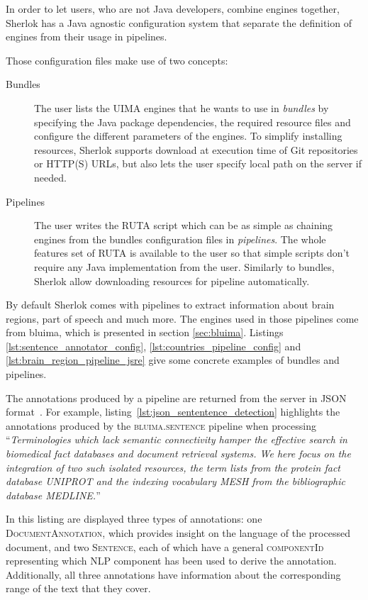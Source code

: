 \documentclass{article}
\newcommand{\ID}[1]{{\textsc{#1}}}
\begin{document}
In order to let users, who are not Java developers, combine engines together, Sherlok has a Java
agnostic configuration system that separate the definition of engines from their usage in pipelines.

Those configuration files make use of two concepts:

\begin{description}
    \item[Bundles] The user lists the UIMA engines that he wants to use in \emph{bundles} by
        specifying the Java package dependencies, the required resource files and configure the
        different parameters of the engines. To simplify installing resources, Sherlok supports
        download at execution time of Git repositories or HTTP(S) URLs, but also lets the user
        specify local path on the server if needed.
    \item[Pipelines] The user writes the RUTA script which can be as simple as chaining engines from
        the bundles configuration files in \emph{pipelines}. The whole features set of RUTA is
        available to the user so that simple scripts don't require any Java implementation from the
        user. Similarly to bundles, Sherlok allow downloading resources for pipeline automatically.
\end{description}

By default Sherlok comes with pipelines to extract information about brain regions, part of speech
and much more. The engines used in those pipelines come from bluima, which is presented in section
\ref{sec:bluima}. Listings \ref{lst:sentence_annotator_config}, \ref{lst:countries_pipeline_config}
and \ref{lst:brain_region_pipeline_jsre} give some concrete examples of bundles and pipelines.

The annotations produced by a pipeline are returned from the server in JSON format~\cite{json}. For
example, listing~\ref{lst:json_sententence_detection} highlights the annotations produced by the
\ID{bluima.sentence} pipeline when processing ``\textit{Terminologies which lack semantic
connectivity hamper the effective search in biomedical fact databases and document retrieval
systems. We here focus on the integration of two such isolated resources, the term lists from the
protein fact database UNIPROT and the indexing vocabulary MESH from the bibliographic database
MEDLINE.}''

In this listing are displayed three types of annotations: one \ID{DocumentAnnotation}, which provides insight
on the language of the processed document, and two \ID{Sentence}, each of which have a general
\ID{componentId} representing which NLP component has been used to derive the annotation.
Additionally, all three annotations have information about the corresponding range of the text that
they cover.
\end{document}
